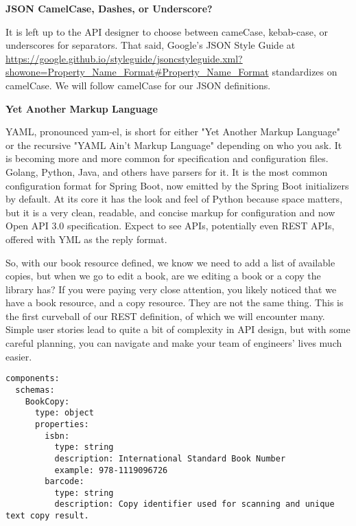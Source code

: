 \begin{sidebar}
\begin{center}
\textbf{JSON CamelCase, Dashes, or Underscore?}
\end{center}

It is left up to the API designer to choose between cameCase, kebab-case, or underscores for separators.  That said, Google's JSON Style Guide at \url{https://google.github.io/styleguide/jsoncstyleguide.xml?showone=Property_Name_Format#Property_Name_Format} standardizes on camelCase.  We will follow camelCase for our JSON definitions.

\end{sidebar}

\begin{sidebar}
\begin{center}
\textbf{Yet Another Markup Language}
\end{center}

YAML, pronounced yam-el, is short for either "Yet Another Markup Language" or the recursive "YAML Ain't Markup Language" depending on who you ask.  It is becoming more and more common for specification and configuration files.  Golang, Python, Java, and others have parsers for it.  It is the most common configuration format for Spring Boot, now emitted by the Spring Boot initializers by default.  At its core it has the look and feel of Python because space matters, but it is a very clean, readable, and concise markup for configuration and now Open API 3.0 specification.  Expect to see APIs, potentially even REST APIs, offered with YML as the reply format.

\end{sidebar}

So, with our book resource defined, we know we need to add a list of available copies, but when we go to edit a book, are we editing a book or a copy the library has?  If you were paying very close attention, you likely noticed that we have a book resource, and a copy resource.  They are not the same thing.  This is the first curveball of our REST definition, of which we will encounter many.  Simple user stories lead to quite a bit of complexity in API design, but with some careful planning, you can navigate and make your team of engineers' lives much easier.

\begin{minipage}{\linewidth}
\begin{code}
\begin{lstlisting}[belowskip=-\baselineskip]
components:
  schemas:
    BookCopy:
      type: object
      properties:
        isbn:
          type: string
          description: International Standard Book Number
          example: 978-1119096726
        barcode:
          type: string
          description: Copy identifier used for scanning and unique text copy result.
\end{lstlisting}
\end{code}
\end{minipage}

